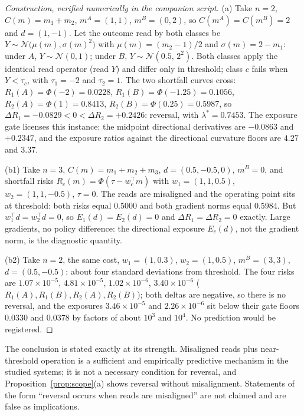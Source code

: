 \documentclass[11pt]{article}
\theoremstyle{definition}
\theoremstyle{remark}
\newcommand{\lamstar}{\lambda^{*}}
\begin{document}
\begin{proof}[Construction, verified numerically in the companion script]
(a) Take $n = 2$, $C(m) = m_1 + m_2$, $m^A = (1,1)$, $m^B = (0,2)$, so
$C(m^A) = C(m^B) = 2$ and $d = (1,-1)$. Let the outcome read by both classes
be $Y \sim \mathcal{N}\bigl(\mu(m), \sigma(m)^2\bigr)$ with
$\mu(m) = (m_2 - 1)/2$ and $\sigma(m) = 2 - m_1$: under $A$,
$Y \sim \mathcal{N}(0,1)$; under $B$, $Y \sim \mathcal{N}(0.5,\,2^2)$. Both
classes apply the identical read operator (read $Y$) and differ only in
threshold; class $c$ fails when $Y < \tau_c$, with $\tau_1 = -2$ and
$\tau_2 = 1$. The two shortfall curves cross:
$R_1(A) = \Phi(-2) = 0.0228$, $R_1(B) = \Phi(-1.25) = 0.1056$,
$R_2(A) = \Phi(1) = 0.8413$, $R_2(B) = \Phi(0.25) = 0.5987$, so
$\Delta R_1 = -0.0829 < 0 < \Delta R_2 = +0.2426$: reversal, with
$\lamstar = 0.7453$. The exposure gate licenses this instance: the midpoint
directional derivatives are $-0.0863$ and $+0.2347$, and the exposure
ratios against the directional curvature floors are $4.27$ and $3.37$.

(b1) Take $n = 3$, $C(m) = m_1 + m_2 + m_3$, $d = (0.5, -0.5, 0)$,
$m^B = 0$, and shortfall risks $R_c(m) = \Phi(\tau - w_c^{\top} m)$ with
$w_1 = (1, 1, 0.5)$, $w_2 = (1, 1, -0.5)$, $\tau = 0$. The reads are
misaligned and the operating point sits at threshold: both risks equal
$0.5000$ and both gradient norms equal $0.5984$. But $w_1^{\top} d =
w_2^{\top} d = 0$, so $E_1(d) = E_2(d) = 0$ and $\Delta R_1 = \Delta R_2 =
0$ exactly. Large gradients, no policy difference: the directional exposure
$E_c(d)$, not the gradient norm, is the diagnostic quantity.

(b2) Take $n = 2$, the same cost, $w_1 = (1, 0.3)$, $w_2 = (1, 0.5)$,
$m^B = (3,3)$, $d = (0.5, -0.5)$: about four standard deviations from
threshold. The four risks are
$1.07\times 10^{-5}$, $4.81\times 10^{-5}$, $1.02\times 10^{-6}$,
$3.40\times 10^{-6}$ ($R_1(A), R_1(B), R_2(A), R_2(B)$); both deltas are
negative, so there is no reversal, and the exposures
$3.46\times 10^{-5}$ and $2.26\times 10^{-6}$ sit below their gate floors
$0.0330$ and $0.0378$ by factors of about $10^{3}$ and $10^{4}$. No
prediction would be registered.
\end{proof}

The conclusion is stated exactly at its strength. Misaligned reads plus
near-threshold operation is a sufficient and empirically predictive
mechanism in the studied systems; it is not a necessary condition for
reversal, and Proposition~\ref{prop:scope}(a) shows reversal without
misalignment. Statements of the form ``reversal occurs when reads are
misaligned'' are not claimed and are false as implications.
\end{document}
